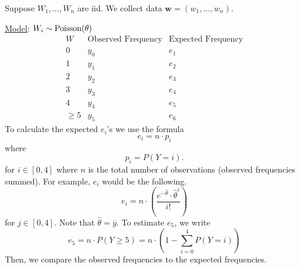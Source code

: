 \begin{exbox}
    \begin{example}
        Suppose $ W_1,\ldots ,W_n $ are iid. We collect data $ \bm{w}=(w_1,\ldots ,w_n) $.

        \underline{Model}: $ W_i \sim \operatorname{Poisson}(\theta) $
        \[
            \begin{array}{c|c|c|}
                W           & \text{Observed Frequency} & \text{Expected Frequency} \\
                \hline
                0           & y_0                       & e_1                       \\
                1           & y_1                       & e_2                       \\
                2           & y_2                       & e_3                       \\
                3           & y_3                       & e_4                       \\
                4           & y_4                       & e_5                       \\
                \geqslant 5 & y_5                       & e_6
            \end{array}
        \]
        To calculate the expected $ e_i $'s we use the formula
        \[ e_i=n\cdot p_i \]
        where
        \[ p_i=P(Y=i). \]
        for $ i\in[0,4] $ where $ n $ is the total number of observations (observed frequencies summed).
        For example, $ e_i $ would be the following.
        \[ e_i=n\cdot \left( \frac{e^{-\hat{\theta}}\cdot\hat{\theta}^{i}}{i!} \right) \]
        for $ j\in[0,4] $. Note that $ \hat{\theta}=\bar{y} $.
        To estimate $ e_5 $, we write
        \[ e_5=n\cdot P(Y\geqslant 5)=n\cdot \left( 1-\sum\limits_{i=0}^{4}P(Y=i) \right) \]
        Then, we compare the observed frequencies to the expected frequencies.
    \end{example}
\end{exbox}
